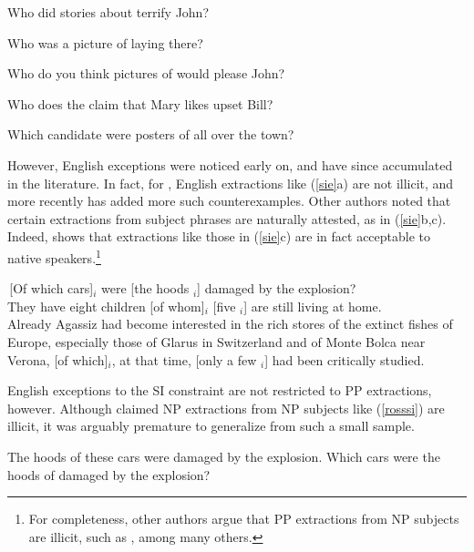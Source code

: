 \documentclass[output=paper]{langsci/langscibook}
\begin{document}
\ea \label{all}
\ea  *Who did stories about terrify John?\\
 \citep[106]{chomsky77b}

\ex  *Who was a picture of laying there?\\
\citep[114]{kayne81} 

\ex *Who do you think pictures of would please John?\\
\citep[497]{huang82}

\ex *Who does the claim that Mary likes upset Bill?\\
\citep[42]{lasniksaito}

\ex *Which candidate were posters of  all over the town?\\
\citep{lasnikpark}
\z \label{classic}
\z


\noindent
However, English exceptions were noticed early on, and have since accumulated in the literature.
In fact,  for \citet{Ross67},  English extractions like (\ref{sie}a) are not illicit,
and more recently \citet[147]{chomsky08} has added more such counterexamples.
Other authors noted that certain extractions from subject phrases are naturally attested, as in (\ref{sie}b,c). Indeed,  \citet{annerels} shows that extractions like those in (\ref{sie}c) are in fact acceptable to native speakers.\footnote{For completeness, other authors argue that PP extractions from
 NP subjects are illicit, such as \citet[653]{lasnikpark}, among many others.}


\ea
\ea \,[Of which cars]$_i$ were [the hoods \spc$_i$] damaged by the explosion?\\
\citep[4.252]{Ross67} 
\ex They have eight children [of whom]$_i$ [five \spc$_i$] are still living at home.\\
\citep[1093]{hud12} 
\ex Already Agassiz had become interested in the rich stores of the extinct fishes of Europe, especially those of Glarus in Switzerland and of Monte Bolca near Verona, [of which]$_i$, at that time, [only a few \spc$_i$] had been critically studied.\\
\citep{santorini}
\z \label{sie}
\z

\noindent
English exceptions to the SI constraint are not restricted to PP extractions, however. Although
\citet{Ross67} claimed NP extractions from NP subjects like (\ref{rosssi}) are illicit,
it was arguably premature to generalize from such a small sample.

\ea
\ea The hoods of these cars were damaged by the explosion. 
\ex \bad{*}Which cars were the hoods of damaged by the explosion?\\
\citep{Ross67}
\z \label{rosssi}
\z
\end{document}
